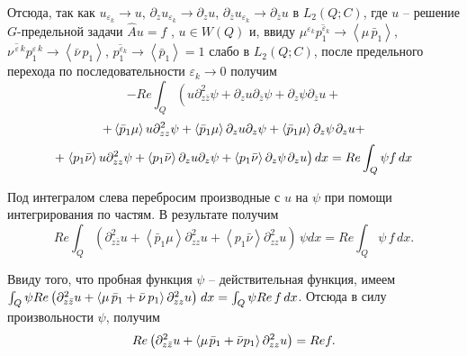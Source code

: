 Отсюда, так как $u_{\varepsilon _{k} } \to u$, $\partial _{z} u_{\varepsilon _{k} } \to \partial _{z} u$, $\partial _{\bar{z}} u_{\varepsilon _{k} } \to \partial _{\bar{z}} u$ в $L_{2} (Q;C)$, где $u$ -- решение $G$-предельной задачи  $\hat{A}u=f$ , $u\in W(Q)$ и, ввиду $\mu ^{\varepsilon _{k} } \overline{p_{1}^{\varepsilon _{k} } }\to \left\langle \mu \, \bar{p}_{1} \right\rangle $, $\overline{\nu ^{\, \varepsilon \, k} }p_{1}^{\varepsilon \, k} \to \left\langle \bar{\nu }\, p_{1} \right\rangle $, $\overline{p_{1}^{\varepsilon _{k} } }\to \left\langle \bar{p}_{1} \right\rangle =1$ слабо в $L_{2} (Q;C)$, после предельного перехода по последовательности $\varepsilon _{k} \to 0$ получим
\begin{equation*}
-Re\int _{Q}\left(u\partial _{z\bar{z}}^{2} \psi +\partial _{z} u\partial _{\bar{z}} \psi +\partial _{z} \psi \partial _{\bar{z}} u\right.+
\end{equation*}
\begin{equation*}
+\left\langle \bar{p}_{1} \mu \right\rangle u\partial _{zz}^{2} \psi +\left\langle \bar{p}_{1} \mu \right\rangle \partial _{z} u\partial _{z} \psi +\left\langle \bar{p}_{1} \mu \right\rangle \partial _{z} \psi {\kern 1pt} \partial _{z} u+
\end{equation*}
\begin{equation*}
+\left. \left\langle p_{1} \bar{\nu }\right\rangle u\partial _{zz}^{2} \psi +\left\langle p_{1} \bar{\nu }\right\rangle \partial _{z} u\partial _{z} \psi +\left\langle p_{1} \bar{\nu }\right\rangle \partial _{z} \psi {\kern 1pt} \partial _{z} u\right)dx=Re\int _{Q}\psi f\, dx
\end{equation*}

Под интегралом слева перебросим производные с $u$ на $\psi $ при помощи интегрирования по частям. В результате получим
\begin{equation*}
Re\int _{Q}\left(\partial _{z\bar{z}}^{2} u+\left\langle \bar{p}_{1} \mu \right\rangle \partial _{zz}^{2} u+\left\langle p_{1} \bar{\nu }\right\rangle \partial _{zz}^{2} u\right) \, \psi dx=Re\int _{Q}\psi \, f\, dx .
\end{equation*}

Ввиду того, что пробная функция $\psi $ -- действительная функция, имеем $\int _{Q}\psi Re\left(\partial _{z\bar{z}}^{2} u+\left\langle \mu \, \bar{p}_{1} +\bar{\nu }\, p_{1} \right\rangle \partial _{zz}^{2} u\right){\kern 1pt}  dx=\int _{Q}\psi Re\, f\, dx $. Отсюда в силу произвольности $\psi $, получим
\begin{equation}
\label{sirM2.23_}
Re\left(\partial _{z\bar{z}}^{2} u+\left\langle \mu {\kern 1pt} \bar{p}_{1} +\bar{\nu }p_{1} \right\rangle \partial _{zz}^{2} u\right)=Ref.
\end{equation}

